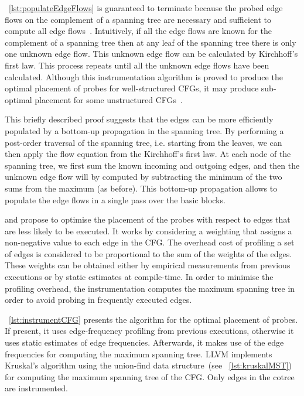 \lstlistingname~\ref{lst:populateEdgeFlows} is guaranteed to terminate because the probed edge flows on the complement of a spanning tree are necessary and sufficient to compute all edge flows~\citep{nahapetian73,forman81}.
Intuitively, if all the edge flows are known for the complement of a spanning tree then at any leaf of the spanning tree there is only one unknown edge flow.
This unknown edge flow can be calculated by Kirchhoff's first law.
This process repeats until all the unknown edge flows have been calculated.
Although this instrumentation algorithm is proved to produce the optimal placement of probes for well-structured CFGs, it may produce sub-optimal placement for some unstructured CFGs~\citep{ball94}.

This briefly described proof suggests that the edges can be more efficiently populated by a bottom-up propagation in the spanning tree.
By performing a post-order traversal of the spanning tree, i.e. starting from the leaves, we can then apply the flow equation from the Kirchhoff's first law.
At each node of the spanning tree, we first sum the known incoming and outgoing edges, and then the unknown edge flow will by computed by subtracting the minimum of the two sums from the maximum (as before).
This bottom-up propagation allows to populate the edge flows in a single pass over the basic blocks.

\cite{forman81} and \cite{ball94} propose to optimise the placement of the probes with respect to edges that are less likely to be executed.
It works by considering a weighting that assigns a non-negative value to each edge in the CFG.
The overhead cost of profiling a set of edges is considered to be proportional to the sum of the weights of the edges.
These weights can be obtained either by empirical measurements from previous executions or by static estimates at compile-time.
In order to minimise the profiling overhead, the instrumentation computes the maximum spanning tree in order to avoid probing in frequently executed edges.

\lstlistingname~\ref{lst:instrumentCFG} presents the algorithm for the optimal placement of probes.
If present, it uses edge-frequency profiling from previous executions,
otherwise it uses static estimates of edge frequencies.
Afterwards, it makes use of the edge frequencies for computing the maximum spanning tree.
LLVM implements Kruskal's algorithm using the union-find data structure~(see \lstlistingname~\ref{lst:kruskalMST})
for computing the maximum spanning tree of the CFG.
Only edges in the cotree are instrumented.

